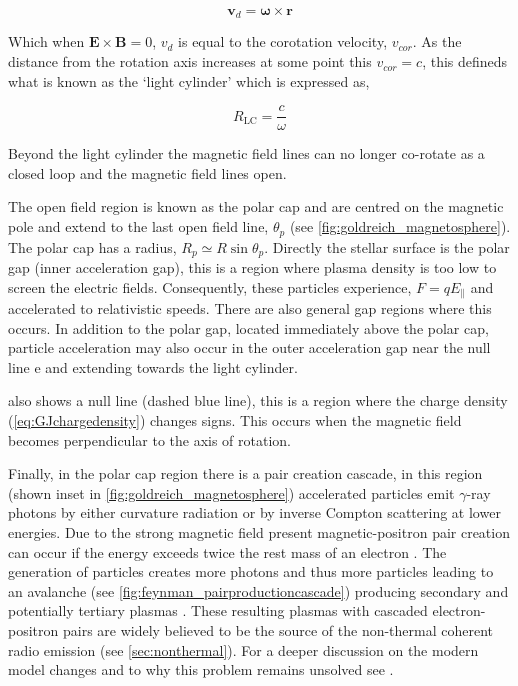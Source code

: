 \begin{equation}
    \mathbf{v}_{d} = \boldsymbol{\omega} \times \mathbf{r}
\end{equation}

Which when $\mathbf{E} \times \mathbf{B} = 0$, $v_d$ is equal to the corotation velocity, $v_{cor}$. As the distance from the rotation axis increases at some point this $v_{cor} = c$, this defineds what is known as the `light cylinder' which is expressed as, 

\begin{equation}
    R_{\text{LC}} = \frac{c}{\omega}
\end{equation}

Beyond the light cylinder the magnetic field lines can no longer co-rotate as a closed loop and the magnetic field lines open. 

The open field region is known as the polar cap and are centred on the magnetic pole and extend to the last open field line, $\theta_p$ (see \cref{fig:goldreich_magnetosphere}). The polar cap has a radius, $R_p \simeq R \sin \theta_p$. Directly the stellar surface is the polar gap (inner acceleration gap), this is a region where plasma density is too low to screen the electric fields. Consequently, these particles experience, $F=qE_\parallel$ and accelerated to relativistic speeds. There are also general gap regions where this occurs. In addition to the polar gap, located immediately above the polar cap, particle acceleration may also occur in the outer acceleration gap near the null line e and extending towards the light cylinder.


 also shows a null line (dashed blue line), this is a region where the charge density (\cref{eq:GJchargedensity}) changes signs. This occurs when the magnetic field becomes perpendicular to the axis of rotation.

Finally, in the polar cap region there is a pair creation cascade, in this region (shown inset in \cref{fig:goldreich_magnetosphere}) accelerated particles emit $\gamma$-ray photons by either curvature radiation or by inverse Compton scattering at lower energies. Due to the strong magnetic field present magnetic-positron pair creation can occur if the energy exceeds twice the rest mass of an electron \citep{Eber1966}. The generation of particles creates more photons and thus more particles leading to an avalanche (see \cref{fig:feynman_pairproductioncascade}) producing secondary and potentially tertiary plasmas \citep{sturrock_model_1971}. These resulting plasmas with cascaded electron-positron pairs are widely believed to be the source of the non-thermal coherent radio emission (see \cref{sec:nonthermal}). For a deeper discussion on the modern model changes and to why this problem remains unsolved see \cite{melrose_pulsar_2016}.

